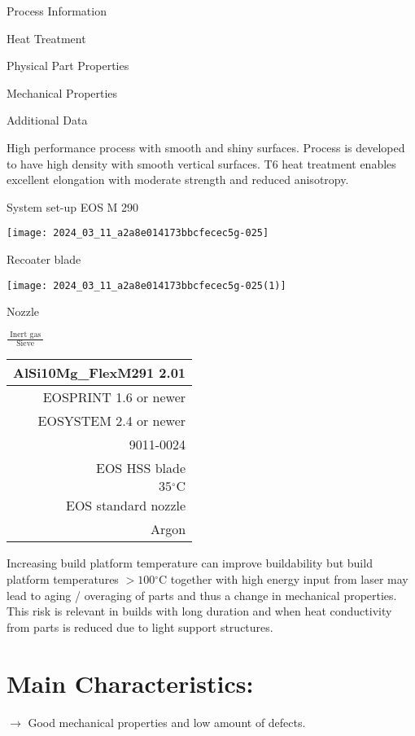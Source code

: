 \documentclass[10pt]{article}
\begin{document}
Process Information

Heat Treatment

Physical Part Properties

Mechanical Properties

Additional Data

High performance process with smooth and shiny surfaces. Process is developed to have high density with smooth vertical surfaces. T6 heat treatment enables excellent elongation with moderate strength and reduced anisotropy.

System set-up EOS M 290

\begin{center}
\texttt{[image: 2024\_03\_11\_a2a8e014173bbcfecec5g-025]}
\end{center}

Recoater blade

\begin{center}
\texttt{[image: 2024\_03\_11\_a2a8e014173bbcfecec5g-025(1)]}
\end{center}

Nozzle

$\frac{\text { Inert gas }}{\text { Sieve }}$

\begin{center}
\begin{tabular}{r}
\hline
AlSi10Mg\_FlexM291 2.01 \\
\hline
EOSPRINT 1.6 or newer \\
EOSYSTEM 2.4 or newer \\
\hline
9011-0024 \\
\hline
EOS HSS blade \\
\hline
$35{ }^{\circ} \mathrm{C}$ \\
EOS standard nozzle \\
Argon \\
\hline
\end{tabular}
\end{center}

Increasing build platform temperature can improve buildability but build platform temperatures $>100{ }^{\circ} \mathrm{C}$ together with high energy input from laser may lead to aging / overaging of parts and thus a change in mechanical properties. This risk is relevant in builds with long duration and when heat conductivity from parts is reduced due to light support structures.

\section*{Main Characteristics:}
$\longrightarrow$ Good mechanical properties and low amount of defects.
\end{document}
